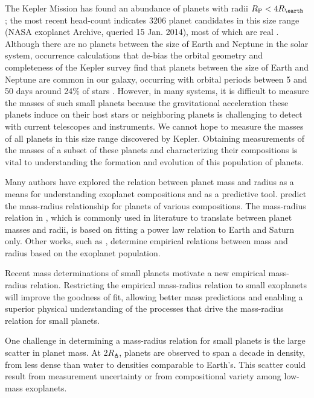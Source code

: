 \documentclass[iop]{emulateapj}
\newcommand{\rpl}{\ensuremath{R_{\rm P}}}
\newcommand{\rearth}{\ensuremath{R_\earth}}
\begin{document}
The Kepler Mission has found an abundance of planets with radii $\rpl < 4\rearth$ \citep{Batalha2013}; the most recent head-count indicates 3206 planet candidates in this size range (NASA exoplanet Archive, queried 15 Jan. 2014), most of which are real \citep{MortonJohnson2011}.  Although there are no planets between the size of Earth and Neptune in the solar system, occurrence calculations that de-bias the orbital geometry and completeness of the Kepler survey find that planets between the size of Earth and Neptune are common in our galaxy, occurring with orbital periods between 5 and 50 days around 24\% of stars \citep{Petigura2013a}.  However, in many systems, it is difficult to measure the masses of such small planets because the gravitational acceleration these planets induce on their host stars or neighboring planets is challenging to detect with current telescopes and instruments.  We cannot hope to measure the masses of all planets in this size range discovered by Kepler.  Obtaining measurements of the masses of a subset of these planets and characterizing their compositions is vital to understanding the formation and evolution of this population of planets.

Many authors have explored the relation between planet mass and radius as a means for understanding exoplanet compositions and as a predictive tool.  \citet{Seager2007} predict the mass-radius relationship for  planets of various compositions.  The mass-radius relation in \citet{Lissauer2011}, which is commonly used in literature to translate between planet masses and radii, is based on fitting a power law relation to Earth and Saturn only.  Other works, such as \citet{Enoch2012, Kane2012, Weiss2013}, determine empirical relations between mass and radius based on the exoplanet population.  

Recent mass determinations of small planets motivate a new empirical mass-radius relation.  Restricting the empirical mass-radius relation to small exoplanets will improve the goodness of fit, allowing better mass predictions and enabling a superior physical understanding of the processes that drive the mass-radius relation for small planets.  

One challenge in determining a mass-radius relation for small planets is the large scatter in planet mass.  At 2\rearth, planets are observed to span a decade in density, from less dense than water to densities comparable to Earth's.  This scatter could result from measurement uncertainty or from compositional variety among low-mass exoplanets.
\end{document}
